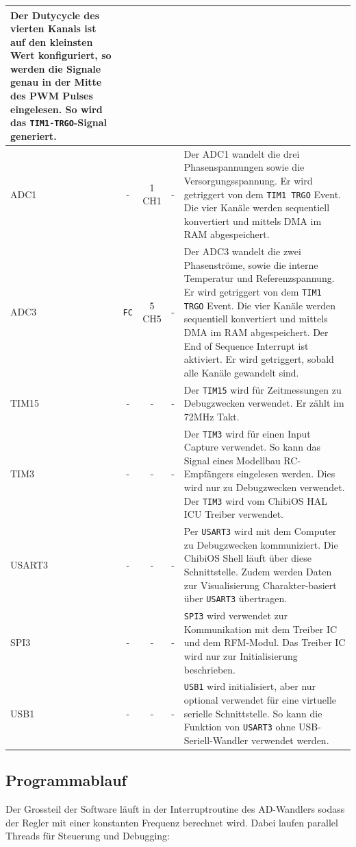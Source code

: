 \begin{tabularx}{\textwidth}{l|c|c|c|X}
	Der Dutycycle des vierten Kanals ist auf den kleinsten Wert konfiguriert, so werden die Signale genau in der Mitte des PWM Pulses eingelesen. So wird das \texttt{TIM1-TRGO}-Signal generiert.
	\\ \hline
	ADC1 &
	- &
	1 CH1 &
	- &
	Der ADC1 wandelt die drei Phasenspannungen sowie die Versorgungsspannung. Er wird getriggert von dem \texttt{TIM1 TRGO} Event. Die vier Kanäle werden sequentiell konvertiert und mittels DMA im RAM abgespeichert.
	\\ \hline
	ADC3 &
	\texttt{FC} &
	5 CH5 &
	- &
	Der ADC3 wandelt die zwei Phasenströme, sowie die interne Temperatur und Referenzspannung. Er wird getriggert von dem \texttt{TIM1 TRGO} Event. Die vier Kanäle werden sequentiell konvertiert und mittels DMA im RAM abgespeichert. Der End of Sequence Interrupt ist aktiviert. Er wird getriggert, sobald alle Kanäle gewandelt sind.
	\\ \hline
	TIM15 &
	- &
	- &
	- &
	Der \texttt{TIM15} wird für Zeitmessungen zu Debugzwecken verwendet. Er zählt im 72MHz Takt.
	\\ \hline
	TIM3 &
	- &
	- &
	- &
	Der \texttt{TIM3} wird für einen Input Capture verwendet. So kann das Signal eines Modellbau RC-Empfängers eingelesen werden. Dies wird nur zu Debugzwecken verwendet. Der \texttt{TIM3} wird vom ChibiOS HAL ICU Treiber verwendet.
	\\ \hline
	USART3 &
	- &
	- &
	- &
	Per \texttt{USART3} wird mit dem Computer zu Debugzwecken kommuniziert. Die ChibiOS Shell läuft über diese Schnittstelle. Zudem werden Daten zur Visualisierung Charakter-basiert über \texttt{USART3} übertragen.
	\\ \hline
	SPI3 &
	- &
	- &
	- &
	\texttt{SPI3} wird verwendet zur Kommunikation mit dem Treiber IC und dem RFM-Modul. Das Treiber IC wird nur zur Initialisierung beschrieben.
	\\ \hline
	USB1 &
	- &
	- &
	- &
	\texttt{USB1} wird initialisiert, aber nur optional verwendet für eine virtuelle serielle Schnittstelle. So kann die Funktion von \texttt{USART3} ohne USB-Seriell-Wandler verwendet werden. \\
	\hline
\end{tabularx}
\label{tab:periph}


\subsection*{Programmablauf}
Der Grossteil der Software läuft in der Interruptroutine des AD-Wandlers sodass der Regler mit einer konstanten Frequenz berechnet wird. Dabei laufen parallel Threads für Steuerung und Debugging:\\

